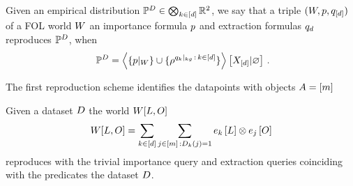 




\begin{definition}
	Given an empirical distribution $\mathbb{P}^{D}\in\bigotimes_{k\in[d]}\mathbb{R}^2$, we say that a triple $(W,p,q_{[d]})$ of a FOL world $W$ an importance formula $p$ and extraction formulas $q_{d}$ reproduces $\mathbb{P}^{D}$, when 
		\[ \empdistribution = \normationof{\{\groundingof{\impformula}\}\cup\{\rencodingof{\kggroundingof{\extformulaof{\atomenumerator}}\, : \, \atomenumeratorin}\}}{\shortcatvariables} \, .  \]
\end{definition}



The first reproduction scheme identifies the datapoints with objects $A=[m]$

\begin{theorem}
	Given a dataset $D$ the world $W[L,O]$ 
	\begin{align*}
		W[L,O] = \sum_{k\in[d]} \sum_{j\in[m] \, : D_{k}(j)=1} e_{k}\left[L\right] \otimes e_{j}\left[O\right]
	\end{align*}
	reproduces with the trivial importance query and extraction queries coinciding with the predicates the dataset $D$.
\end{theorem}



